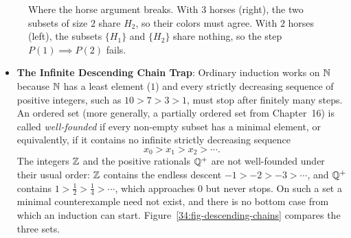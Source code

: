 \begin{figure}[htbp]
\caption{Where the horse argument breaks. With $3$ horses (right), the two subsets of size $2$ share $H_2$, so their colors must agree. With $2$ horses (left), the subsets $\{H_1\}$ and $\{H_2\}$ share nothing, so the step $P(1) \implies P(2)$ fails.}
\label{34:fig-horses}
\end{figure}

\begin{itemize}
  \item \textbf{The Infinite Descending Chain Trap}: Ordinary induction works on $\mathbb{N}$ because $\mathbb{N}$ has a least element ($1$) and every strictly decreasing sequence of positive integers, such as $10 > 7 > 3 > 1$, must stop after finitely many steps. An ordered set (more generally, a partially ordered set from Chapter~16) is called \emph{well-founded} if every non-empty subset has a minimal element, or equivalently, if it contains no infinite strictly decreasing sequence
  \[
  x_0 > x_1 > x_2 > \cdots.
  \]
  The integers $\mathbb{Z}$ and the positive rationals $\mathbb{Q}^+$ are not well-founded under their usual order: $\mathbb{Z}$ contains the endless descent $-1 > -2 > -3 > \cdots$, and $\mathbb{Q}^+$ contains $1 > \tfrac12 > \tfrac14 > \cdots$, which approaches $0$ but never stops. On such a set a minimal counterexample need not exist, and there is no bottom case from which an induction can start. Figure~\ref{34:fig-descending-chains} compares the three sets.
\end{itemize}

